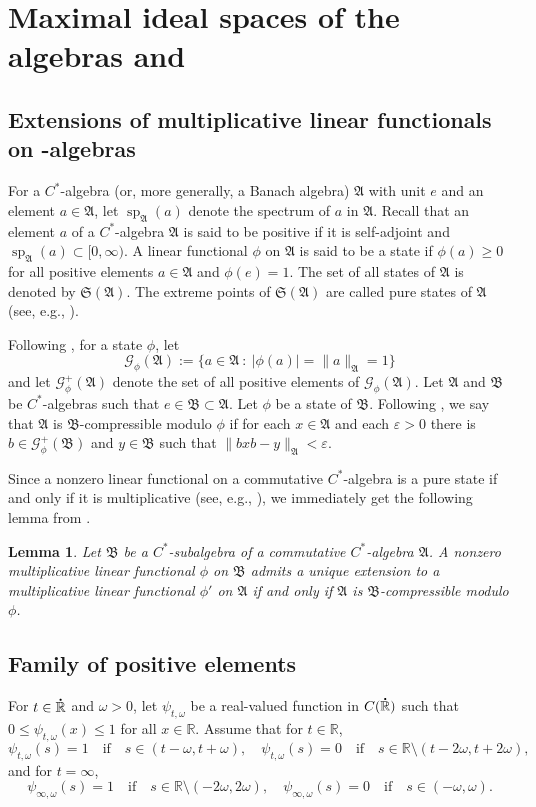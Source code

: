 \documentclass{birkjour}
\newtheorem{lemma}[theorem]{Lemma}
\numberwithin{equation}{section}
\newcommand{\R}{\mathbb{R}}
\newcommand{\fA}{\mathfrak{A}}
\newcommand{\fB}{\mathfrak{B}}
\newcommand{\fS}{\mathfrak{S}}
\newcommand{\spe}{\operatorname{sp}}
\newcommand{\eps}{\varepsilon}
\newcommand{\dR}{{\bf\dot{\R}}}
\begin{document}
\section{Maximal ideal spaces of the algebras  and
\boldmath{$SO_{X(\R)}^\diamond$}}
\label{sec:maximal-ideal-space}
\subsection{Extensions of multiplicative linear functionals on
-algebras}
For a $C^*$-algebra (or, more generally, a Banach algebra) $\fA$
with unit $e$ and an element $a\in\fA$, let $\spe_\fA(a)$ denote the spectrum
of $a$ in $\fA$. Recall that an element $a$ of a $C^*$-algebra $\fA$ is said
to be positive if it is self-adjoint and $\spe_\fA(a)\subset[0,\infty)$. A
linear functional $\phi$ on $\fA$ is said to be a state if $\phi(a)\ge 0$
for all positive elements $a\in\fA$ and $\phi(e)=1$. The set of all states
of $\fA$ is denoted by $\fS(\fA)$. The extreme points of $\fS(\fA)$ are called
pure states of $\fA$ (see, e.g., \cite[Section~4.3]{KR97}).

Following \cite[p.~304]{A79}, for a state $\phi$, let
\[
\mathcal{G}_\phi(\fA):=\{a\in\fA\ :\ |\phi(a)|=\|a\|_\fA=1\}
\]
and let $\mathcal{G}_\phi^+(\fA)$ denote the set of all positive elements of
$\mathcal{G}_\phi(\fA)$. Let $\fA$ and $\fB$ be $C^*$-algebras such that
$e\in\fB\subset\fA$. Let $\phi$ be a state of $\fB$. Following
\cite[p.~310]{A79}, we say that $\fA$ is $\fB$-compressible modulo $\phi$
if for each $x\in\fA$ and each $\eps>0$ there is $b\in\mathcal{G}_\phi^+(\fB)$
and $y\in\fB$ such that $\|bxb-y\|_\fA<\eps$.

Since a nonzero linear functional on a commutative $C^*$-algebra is a pure
state if and only if it is multiplicative (see, e.g.,
\cite[Proposition~4.4.1]{KR97}), we immediately get the following
lemma from \cite[Theorem~3.2]{A79}.
\begin{lemma}\label{le:extension-characters}
Let $\fB$ be a $C^*$-subalgebra of a commutative $C^*$-algebra $\fA$.
A nonzero multiplicative linear functional $\phi$ on $\fB$ admits a unique
extension to a multiplicative linear functional $\phi'$ on $\fA$ if and
only if $\fA$ is $\fB$-compressible modulo $\phi$.
\end{lemma}
\subsection{Family of positive elements}
For $t\in\dR$ and $\omega>0$, let $\psi_{t,\omega}$ be a real-valued
function in $C(\dR)$ such that $0\le \psi_{t,\omega}(x)\le 1$
for all $x\in\R$. Assume that for $t\in\R$,
\[
\psi_{t,\omega}(s)=1
\quad\mbox{if}\quad
s\in(t-\omega,t+\omega),
\quad
\psi_{t,\omega}(s)=0
\quad\mbox{if}\quad
s\in\R\setminus(t-2\omega,t+2\omega),
\]
and for $t=\infty$,
\[
\psi_{\infty,\omega}(s)=1
\quad\mbox{if}\quad
s\in\R\setminus(-2\omega,2\omega),
\quad
\psi_{\infty,\omega}(s)=0
\quad\mbox{if}\quad
s\in(-\omega,\omega).
\]
\end{document}
